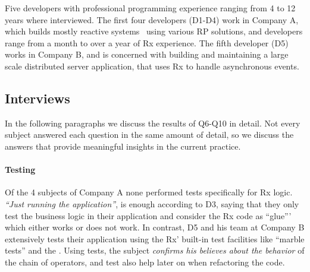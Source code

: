 Five developers with professional programming experience ranging from 4 to 12 years where interviewed.
The first four developers (D1-D4) work in Company A, which builds mostly reactive systems~\cite{boner2014reactive} using various RP solutions,
and developers range from a month to over a year of Rx experience. 
The fifth developer (D5) works in Company B, and is concerned with building and maintaining a large scale distributed server application, that uses Rx to handle asynchronous events.

\subsection{Interviews}
In the following paragraphs we discuss the results of Q6-Q10 in detail. Not every subject answered each question in the same amount of detail, so we discuss the answers that provide meaningful insights in the current practice.

\paragraph{Testing}
Of the 4 subjects of Company A none performed tests specifically for Rx logic. \emph{``Just running the application''}, is enough according to D3, saying that they only test the business logic in their application and consider the Rx code as ``glue''' which either works or does not work. In contrast, D5 and his team at Company B extensively tests their application using the Rx' built-in test facilities like ``marble tests'' and the . Using tests, the subject \emph{confirms his believes about the behavior} of the chain of operators, and test also help later on when refactoring the code.

